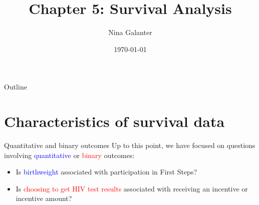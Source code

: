 \documentclass[10pt,t]{beamer}
\title{Chapter 5: Survival Analysis}
\author{Nina Galanter}
\date{\today}
\begin{document}
\begin{frame}
	\titlepage 
\end{frame}

%	
%	

\begin{frame}{Outline}
	\tableofcontents
\end{frame}



\section{Characteristics of survival data}

\begin{frame}{Quantitative and binary outcomes}
Up to this point, we have focused on questions involving \textcolor{blue}{quantitative} or \textcolor{red}{binary} outcomes: 

\medskip

\begin{itemize}
\item Is \textcolor{blue}{birthweight} associated with participation in First Steps?

\medskip

\item Is \textcolor{red}{choosing to get HIV test results} associated with receiving an incentive or incentive amount? 
\end{itemize}
\end{frame}
\end{document}
